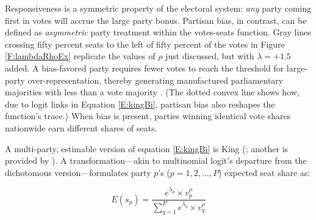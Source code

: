\documentclass[letter,12pt]{article}
\begin{document}
Responsiveness is a symmetric property of the electoral system: \emph{any} party coming first in votes will accrue the large party bonus. Partisan bias, in contrast, can be defined as \emph{asymmetric} party treatment within the votes-seats function. Gray lines crossing fifty percent seats to the left of fifty percent of the votes in Figure \ref{F:lambdaRhoEx} replicate the values of $\rho$ just discussed, but with $\lambda = +1.5$ added. A bias-favored party requires fewer votes to reach the threshold for large-party over-representation, thereby generating manufactured parliamentary majorities with less than a vote majority \citep{lijphartElSysPtySys.1994}. (The dotted convex line shows how, due to logit links in Equation \ref{E:kingBi}, partisan bias also reshapes the function's trace.) When bias is present, parties winning identical vote shares nationwide earn different shares of seats. 



A multi-party, estimable version of equation \ref{E:kingBi} is King (\citeyear{king.1990elRespBiasMultiparty}; another is provided by \citeauthor{calvo.micozzi.govReform.2005} \citeyear{calvo.micozzi.govReform.2005}). A transformation---akin to multinomial logit's departure from the dichotomous version---formulates party $p$'s ($p=1,2,\ldots,P$) expected seat share as:

\begin{equation}\label{E:kingMulti}
 E(s_p) = \frac{e^{\lambda_p} \times v_p^\rho}{\sum_{q=1}^{P} e^{\lambda_q} \times v_q^\rho}
\end{equation}
\end{document}

